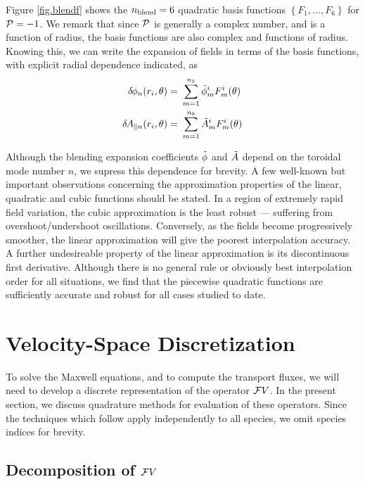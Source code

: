 Figure \ref{fig.blendf} shows the ${n_{\rm blend}} = 6$ quadratic basis 
functions $\left\{F_1, \ldots, F_6\right\}$ for ${\cal P} = -1$.  
We remark that since ${\cal P}$ is generally a complex number, 
and is a function of radius, the basis functions are also 
complex and functions of radius.  Knowing this, we can 
write the expansion of fields in terms of the basis 
functions, with explicit radial dependence indicated, as
%
\begin{align}
\delta \hskip -1pt \phi_n(r_i,\theta) = &~\sum_{m=1}^{n_b} {\tilde{\phi}}_m^i F_m^i(\theta) \\
\delta \hskip -1pt A_{\parallel n}(r_i,\theta)  = &~\sum_{m=1}^{n_b} {\tilde{A}}_m^i F_m^i(\theta) 
\end{align}

Although the blending expansion coefficients $\tilde{\phi}$ and $\tilde{A}$ 
depend on the toroidal mode number $n$, we supress this 
dependence for brevity. 
A few well-known but important observations concerning the 
approximation properties of the linear, quadratic and cubic 
functions should be stated.  In a region of extremely rapid field 
variation, the cubic approximation is the least robust --- suffering 
from overshoot/undershoot oscillations.  Conversely, as the fields 
become progressively smoother, the linear approximation will give 
the poorest interpolation accuracy.  A further undesireable 
property of the linear approximation is its discontinuous first 
derivative.  Although there is no general rule or obviously best 
interpolation order for all situations, we find that the piecewise 
quadratic functions are sufficiently accurate and robust for all 
cases studied to date.

\section{Velocity-Space Discretization}

To solve the Maxwell equations, and to compute the 
transport fluxes, we will need to develop a discrete 
representation of the operator ${\cal F}V$.  In the 
present section, we discuss quadrature methods for evaluation 
of these operators.  Since the techniques which follow apply 
independently to all species, we omit species indices for 
brevity.

\subsection{Decomposition of ${\cal F}V$}

